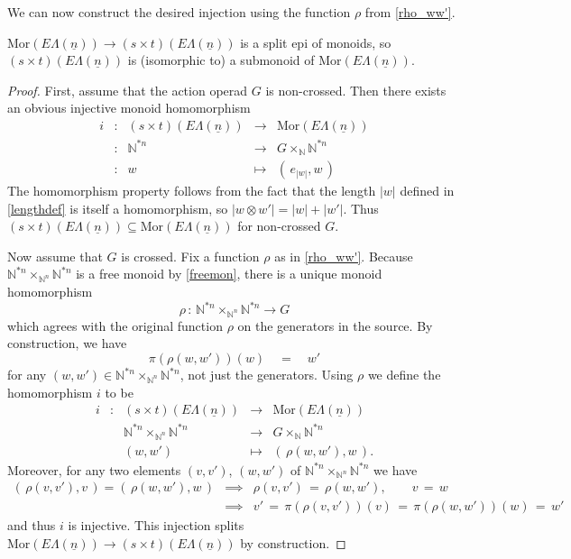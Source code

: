\documentclass{amsbook} %
\newcommand{\ELn}{E\Lambda(\underline{n})}
\numberwithin{section}{chapter}
\begin{document}
We can now construct the desired injection using the function $\rho$ from \cref{rho_ww'}.
\begin{prop} \label{stGnsub} $\mathrm{Mor}(\ELn) \to (s \times t)(\ELn)$ is a split epi of monoids, so$(s \times t)(\ELn)$ is (isomorphic to) a submonoid of $\mathrm{Mor}(\ELn)$.
\end{prop}
\begin{proof}
First, assume that the action operad $G$ is non-crossed. Then there exists an obvious injective monoid homomorphism
\[ \begin{array}{rlrll}
			i & : & (s \times t)(\ELn) & \to & \mathrm{Mor}(\ELn) \\
			& : & \mathbb{N}^{\ast n} & \to & G \times_{\mathbb{N}} \mathbb{N}^{\ast n} \\
			& : & w & \mapsto & ( \, e_{|w|}, w \, )
		\end{array}
\]
The homomorphism property follows from the fact that the length $|w|$ defined in \cref{lengthdef} is itself a homomorphism, so $|w \otimes w'| = |w|+|w'|$. Thus $(s \times t)(\ELn) \subseteq \mathrm{Mor}(\ELn)$ for non-crossed $G$.

Now assume that $G$ is crossed. Fix a function $\rho$ as in \cref{rho_ww'}. Because $\mathbb{N}^{\ast n} \times_{\mathbb{N}^n} \mathbb{N}^{\ast n}$ is a free monoid  by \cref{freemon}, there is a unique monoid homomorphism
\[ \rho \, : \, \mathbb{N}^{\ast n} \times_{\mathbb{N}^n} \mathbb{N}^{\ast n} \longrightarrow G \]
which agrees with the original function $\rho$ on the generators in the source. By construction, we have
\[ \pi(\rho(w, w'))(w) \quad = \quad w' \]
for any $(w, w') \in\mathbb{N}^{\ast n} \times_{\mathbb{N}^n} \mathbb{N}^{\ast n}$, not just the generators. Using $\rho$ we define the homomorphism $i$ to be
\[ \begin{array}{rlrll}
			i & : & (s \times t)(\ELn) & \to & \mathrm{Mor}(\ELn) \\
			&  & \mathbb{N}^{\ast n} \times_{\mathbb{N}^n} \mathbb{N}^{\ast n} & \to & G \times_{\mathbb{N}} \mathbb{N}^{\ast n} \\
			&  & (w, w') & \mapsto & ( \, \rho(w, w'), w \, ).
		\end{array}
\]
Moreover, for any two elements $(v, v')$, $(w, w')$ of $\mathbb{N}^{\ast n} \times_{\mathbb{N}^n} \mathbb{N}^{\ast n}$ we have
\[ \begin{array}{lcl}
		( \, \rho(v, v'), v \, )  =  ( \, \rho(w, w'), w \, ) & \implies & \rho(v, v') \, = \, \rho(w, w'), \quad \quad v \, = \, w \\
		 & \implies & v' \, = \, \pi(\rho(v, v'))(v) \, = \, \pi(\rho(w, w'))(w) \, = \, w'
		\end{array}
\]
and thus $i$ is injective. This injection splits $\mathrm{Mor}(\ELn) \to (s \times t)(\ELn)$ by construction.
\end{proof}
\end{document}
